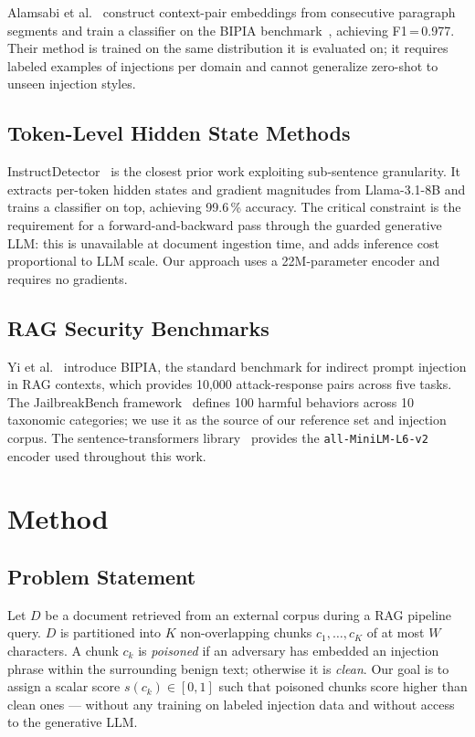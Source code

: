 \documentclass[conference]{IEEEtran}
\begin{document}
Alamsabi et al.~\cite{alamsabi2026context} construct context-pair embeddings from
consecutive paragraph segments and train a classifier on the BIPIA
benchmark~\cite{yi2025bipia}, achieving F1\,=\,0.977. Their method is trained on the
same distribution it is evaluated on; it requires labeled examples of injections per
domain and cannot generalize zero-shot to unseen injection styles.

\subsection{Token-Level Hidden State Methods}

InstructDetector~\cite{wen2025instructdetector} is the closest prior work exploiting
sub-sentence granularity. It extracts per-token hidden states and gradient magnitudes
from Llama-3.1-8B and trains a classifier on top, achieving 99.6\,\% accuracy.
The critical constraint is the requirement for a forward-and-backward pass through the
guarded generative LLM: this is unavailable at document ingestion time, and adds
inference cost proportional to LLM scale. Our approach uses a 22M-parameter encoder
and requires no gradients.

\subsection{RAG Security Benchmarks}

Yi et al.~\cite{yi2025bipia} introduce BIPIA, the standard benchmark for indirect
prompt injection in RAG contexts, which provides 10,000 attack-response pairs across
five tasks. The JailbreakBench framework~\cite{chao2024jailbreakbench} defines 100
harmful behaviors across 10 taxonomic categories; we use it as the source of our
reference set and injection corpus. The sentence-transformers
library~\cite{reimers2019sentence} provides the \texttt{all-MiniLM-L6-v2} encoder
used throughout this work.

\section{Method}
\label{sec:method}

\subsection{Problem Statement}

Let \(D\) be a document retrieved from an external corpus during a RAG pipeline
query. \(D\) is partitioned into \(K\) non-overlapping chunks
\(c_1, \dots, c_K\) of at most \(W\) characters. A chunk \(c_k\) is
\emph{poisoned} if an adversary has embedded an injection phrase within the
surrounding benign text; otherwise it is \emph{clean}. Our goal is to assign a
scalar score \(s(c_k) \in [0, 1]\) such that poisoned chunks score higher than
clean ones --- without any training on labeled injection data and without access to
the generative LLM.
\end{document}
